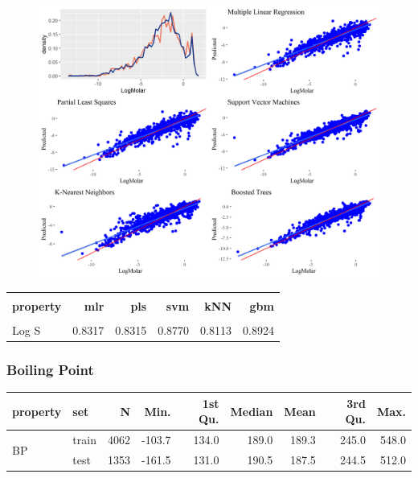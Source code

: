 \documentclass[10pt, letter]{article}
\renewcommand{\=}{\, =\, }
\newcommand{\+}{\, +\, }
\renewcommand{\-}{\, -\, }
\begin{document}
\begin{figure}[H]
  \centering
    \includegraphics[width=1.0\textwidth]{LogMolar_plots.png}
\end{figure}

\begin{table}[H]
\begin{center}
\begin{tabular}{lrrrrr}
\toprule
&&\\
{\bf property} & {\bf mlr} & {\bf pls} &  {\bf svm}  & {\bf kNN}  & {\bf gbm}\\
\midrule
&&\\
Log S  &   0.8317 & 0.8315 & 0.8770 & 0.8113 & 0.8924\\
\midrule
\hline
\end{tabular}
\end{center}
\end{table}

\subsubsection{Boiling Point}

\begin{table}[H]
\begin{center}
\begin{tabular}{llrrrrrrr}
\toprule
{\bf property} & {\bf set} & {\bf N} & {\bf Min.} & {\bf 1st Qu.} &  {\bf Median}  & {\bf Mean}  & {\bf 3rd Qu.} & {\bf Max.}\\
\midrule
\multirow{2}{15mm}{BP}
& train &  4062 & -103.7 & 134.0 & 189.0 & 189.3 & 245.0 & 548.0\\
& test &  1353 & -161.5 & 131.0 & 190.5 & 187.5 & 244.5 & 512.0\\
\midrule
\hline
\end{tabular}
\end{center}
\end{table}
\end{document}

